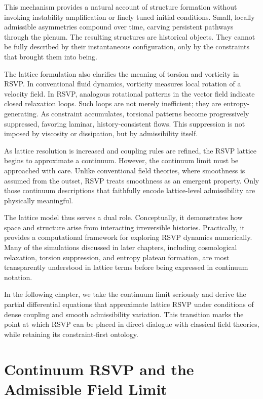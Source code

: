 \documentclass[11pt,oneside]{book}
\begin{document}
This mechanism provides a natural account of structure formation without invoking instability amplification or finely tuned initial conditions. Small, locally admissible asymmetries compound over time, carving persistent pathways through the plenum. The resulting structures are historical objects. They cannot be fully described by their instantaneous configuration, only by the constraints that brought them into being.

The lattice formulation also clarifies the meaning of torsion and vorticity in RSVP. In conventional fluid dynamics, vorticity measures local rotation of a velocity field. In RSVP, analogous rotational patterns in the vector field indicate closed relaxation loops. Such loops are not merely inefficient; they are entropy-generating. As constraint accumulates, torsional patterns become progressively suppressed, favoring laminar, history-consistent flows. This suppression is not imposed by viscosity or dissipation, but by admissibility itself.

As lattice resolution is increased and coupling rules are refined, the RSVP lattice begins to approximate a continuum. However, the continuum limit must be approached with care. Unlike conventional field theories, where smoothness is assumed from the outset, RSVP treats smoothness as an emergent property. Only those continuum descriptions that faithfully encode lattice-level admissibility are physically meaningful.

The lattice model thus serves a dual role. Conceptually, it demonstrates how space and structure arise from interacting irreversible histories. Practically, it provides a computational framework for exploring RSVP dynamics numerically. Many of the simulations discussed in later chapters, including cosmological relaxation, torsion suppression, and entropy plateau formation, are most transparently understood in lattice terms before being expressed in continuum notation.

In the following chapter, we take the continuum limit seriously and derive the partial differential equations that approximate lattice RSVP under conditions of dense coupling and smooth admissibility variation. This transition marks the point at which RSVP can be placed in direct dialogue with classical field theories, while retaining its constraint-first ontology.

\chapter{Continuum RSVP and the Admissible Field Limit}
\end{document}
